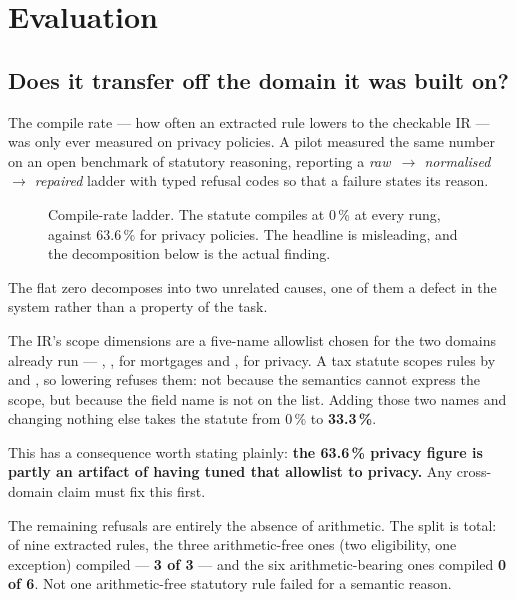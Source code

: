 \documentclass[11pt]{article}
\begin{document}
\section{Evaluation}
\label{sec:eval}

\subsection{Does it transfer off the domain it was built on?}

The compile rate --- how often an extracted rule lowers to the checkable IR
--- was only ever measured on privacy policies. A pilot measured the same
number on an open benchmark of statutory reasoning, reporting a
\emph{raw~$\to$ normalised~$\to$ repaired} ladder with typed refusal codes
so that a failure states its reason.

\begin{figure}[htbp]
  \centering
  \resizebox{\linewidth}{!}{}
  \caption{Compile-rate ladder. The statute compiles at 0\,\% at every
    rung, against 63.6\,\% for privacy policies. The headline is
    misleading, and the decomposition below is the actual finding.}
  \label{fig:ladderplot}
\end{figure}

The flat zero decomposes into two unrelated causes, one of them a defect in
the system rather than a property of the task.

\begin{caution}[title={A hardcoded scope vocabulary}]
The IR's scope dimensions are a five-name allowlist chosen for the two
domains already run --- , ,
 for mortgages and ,
 for privacy. A tax statute scopes rules by
 and , so lowering refuses them: not
because the semantics cannot express the scope, but because the field name
is not on the list. Adding those two names and changing nothing else takes
the statute from 0\,\% to \textbf{33.3\,\%}.

This has a consequence worth stating plainly: \textbf{the 63.6\,\% privacy
figure is partly an artifact of having tuned that allowlist to privacy.}
Any cross-domain claim must fix this first.
\end{caution}

The remaining refusals are entirely the absence of arithmetic. The split is
total: of nine extracted rules, the three arithmetic-free ones
(two eligibility, one exception) compiled --- \textbf{3 of 3} --- and the
six arithmetic-bearing ones compiled \textbf{0 of 6}. Not one
arithmetic-free statutory rule failed for a semantic reason.
\end{document}
